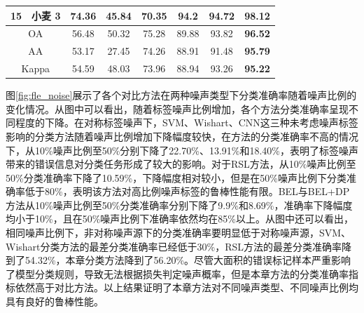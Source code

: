 \begin{table}[ht!]
\begin{tabular}{cccccccc}
    15                        & 小麦 3  & 74.36 & 45.84   & 70.35 & 94.2           & 94.72          & \textbf{98.12} \\
    \midrule[0.75bp]
    \multicolumn{2}{c}{OA}    & 56.48 & 50.32 & 75.28   & 89.88 & 93.82          & \textbf{96.52}                  \\
    \multicolumn{2}{c}{AA}    & 53.17 & 27.45 & 74.26   & 88.91 & 91.48          & \textbf{95.79}                  \\
    \multicolumn{2}{c}{Kappa} & 54.59 & 48.03 & 73.96   & 88.94 & 93.26          & \textbf{95.22}                  \\
    \bottomrule[1.5bp]
  \end{tabular}
\end{table}

图\ref{fig:fle_noise}展示了各个对比方法在两种噪声类型下分类准确率随着噪声比例的变化情况。从图中可以看出，随着标签噪声比例增加，各个方法分类准确率呈现不同程度的下降。在对称标签噪声下，SVM、Wishart、CNN这三种未考虑噪声标签影响的分类方法随着噪声比例增加下降幅度较快，在方法的分类准确率不高的情况下，从10\%噪声比例至50\%分别下降了22.70\%、13.91\%和18.40\%，表明了标签噪声带来的错误信息对分类任务形成了较大的影响。对于RSL方法，从10\%噪声比例至50\%分类准确率下降了10.59\%，下降幅度相对较小，但是在50\%噪声比例下分类准确率低于80\%，表明该方法对高比例噪声标签的鲁棒性能有限。BEL与BEL+DP方法从10\%噪声比例至50\%分类准确率分别下降了9.9\%和8.69\%，准确率下降幅度均小于10\%，且在50\%噪声比例下准确率依然均在85\%以上。从图中还可以看出，相同噪声比例下，非对称噪声源下的分类准确率要明显低于对称噪声源，SVM、Wishart分类方法的最差分类准确率已经低于30\%，RSL方法的最差分类准确率降到了54.32\%，本章分类方法降到了56.20\%。尽管大面积的错误标记样本严重影响了模型分类规则，导致无法根据损失判定噪声概率，但是本章方法的分类准确率指标依然高于对比方法。以上结果证明了本章方法对不同噪声类型、不同噪声比例均具有良好的鲁棒性能。

